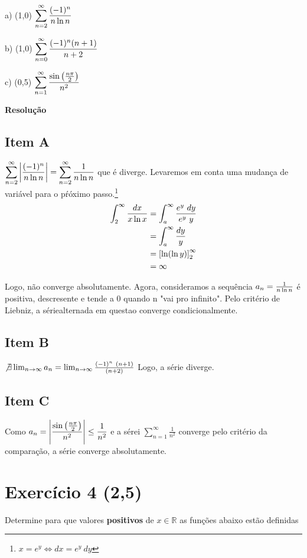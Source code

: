 \documentclass[12pt,openany, letterpaper]{book}
\newcommand{\LI}[1][n]{\lim_{{#1} \rightarrow \infty}}
\newcommand{\soma}[2][n]{\sum_{{#1} = #2}^\infty}
\newcommand{\E}[1]{Exercício #1}
\newcommand{\Resolve}{\begin{center} \textbf{Resolução} \end{center}}
\begin{document}
{{\begin{multicols}{3}
a) (1,0) $\displaystyle{\soma{2} {(-1)^n \over n \ln{n}}}$

b) (1,0) $\displaystyle{\soma{0} {(-1)^n(n+1) \over n+2}}$

c) (0,5) $\displaystyle{\soma{1} {\sin\left({n\pi \over 2}\right) \over n^2}}$
\end{multicols}

\Resolve

\begin{multicols}{3}
\subsection*{Item A}
$\displaystyle{\soma{2} \left|{(-1)^n \over n \ln{n}}\right| = \soma{2} {1 \over n \ln{n}}}$ que é diverge. Levaremos em conta uma mudança de variável para o pŕóximo passo.\footnote{$x = e^y \Longleftrightarrow dx = e^y \ dy$} \begin{align*}
\int_2^\infty {dx \over x\ln{x}} &= \int_a^\infty {e^y \ dy \over e^y \ y} \\
&= \int_a^\infty {dy \over y} \\
&= \left[\ln({\ln{y}})\right]_2^\infty \\
&= \infty
\end{align*}

Logo, não converge absolutamente. Agora, consideramos a sequência $a_n = {1 \over n\ln{n}}$ é positiva, descresente e tende a 0 quando n "vai pro infinito". Pelo critério de Liebniz, a sériealternada em questao converge condicionalmente.

\subsection*{Item B}
$\not \exists \LI a_n = \LI {(-1)^n \ (n+1) \over (n+2)}$ Logo, a série diverge.

\subsection*{Item C}
Como $\displaystyle{a_n = \left|{\sin\left({n\pi \over 2}\right) \over n^2}\right| \leq {1 \over n^2}}$ e a sérei $\displaystyle{\soma{1} \frac{1}{n^2}}$  converge pelo critério da comparação, a série converge absolutamente.
\end{multicols}

\newpage

\section*{\E{4} (2,5)}{Determine para que valores \textbf{positivos} de $x \in \mathds{R}$ as funções abaixo estão definidas}

}}
\end{document}
